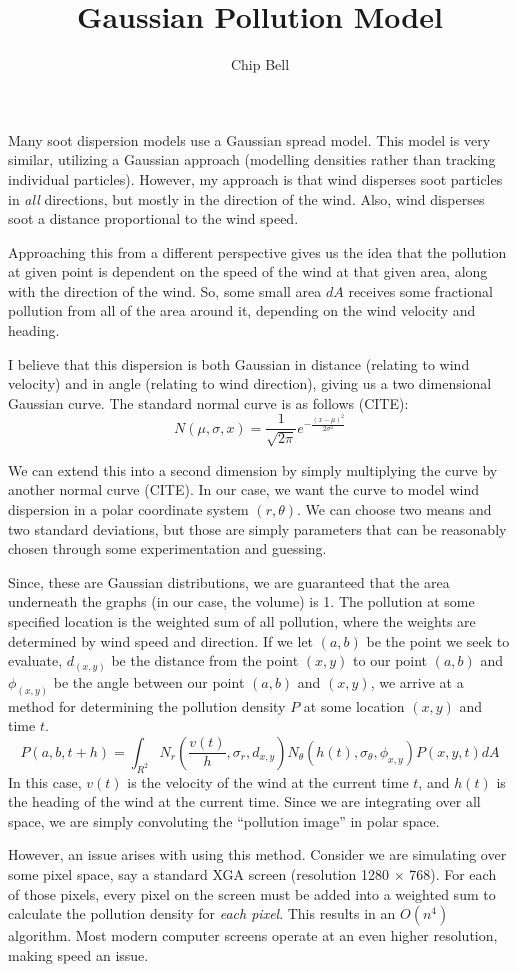 \documentclass[12pt]{article}
\title{Gaussian Pollution Model}
\author{Chip Bell}
\begin{document}
\maketitle
Many soot dispersion models use a Gaussian spread model. This model is very
similar, utilizing a Gaussian approach (modelling densities rather than
tracking individual particles). However, my approach is that wind disperses
soot particles in \emph{all} directions, but mostly in the direction of the
wind. Also, wind disperses soot a distance proportional to the wind speed.

Approaching this from a different perspective gives us the idea that the
pollution at given point is dependent on the speed of the wind at that given
area, along with the direction of the wind. So, some small area $dA$ receives
some fractional pollution from all of the area around it, depending on the
wind velocity and heading.

I believe that this dispersion is both Gaussian in distance (relating to wind
velocity) and in angle (relating to wind direction), giving us a two
dimensional Gaussian curve. The standard normal curve is as follows (CITE):
\[
	N(\mu, \sigma, x) = \frac{1}{\sqrt{2\pi}} e^{-\frac{(x-\mu)^2}{2\sigma^2} }
\]

We can extend this into a second dimension by simply multiplying the curve by
another normal curve (CITE). In our case, we want the curve to model wind
dispersion in a polar coordinate system $(r,\theta)$. We can choose two means
and two standard deviations, but those are simply parameters that can be
reasonably chosen through some experimentation and guessing.

Since, these are Gaussian distributions, we are guaranteed that the area
underneath the graphs (in our case, the volume) is 1. The pollution at some
specified location is the weighted sum of all pollution, where the weights are
determined by wind speed and direction. If we let $(a,b)$ be the point we seek
to evaluate, $d_{(x,y)}$ be the distance from the point $(x,y)$ to our point
$(a,b)$ and $\phi_{(x,y)}$ be the angle between our point $(a,b)$ and $(x,y)$,
we arrive at a method for determining the pollution density $P$ at some
location $(x,y)$ and time $t$.
\[
P(a, b, t+h) = \int_{R^2} N_r(\frac{v(t)}{h}, \sigma_r, d_{x,y})
	N_\theta(h(t), \sigma_\theta, \phi_{x,y}) P(x,y,t) dA 
\]
In this case, $v(t)$ is the velocity of the wind at the current time $t$, and
$h(t)$ is the heading of the wind at the current time. Since we are
integrating over all space, we are simply convoluting the ``pollution image''
in polar space.

However, an issue arises with using this method. Consider we are simulating
over some pixel space, say a standard XGA screen (resolution 1280 
$\times$ 768). For each of those pixels, every pixel on the screen must be
added into a weighted sum to calculate the pollution density for \emph{each
pixel}. This results in an $O(n^4)$ algorithm. Most modern computer screens 
operate at an even higher resolution, making speed an issue.
\end{document}
